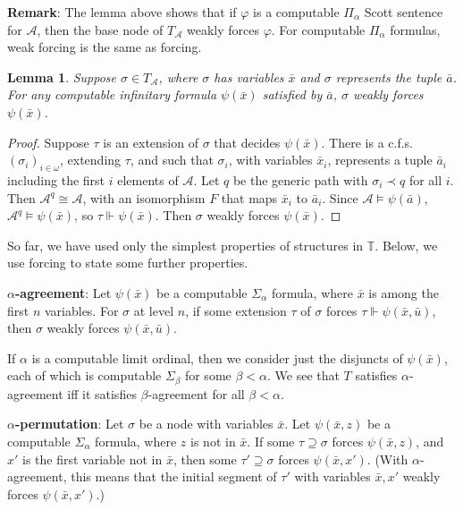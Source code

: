 \documentclass{article}
\newtheorem{lem}[thm]{Lemma}
\begin{document}
\noindent
\textbf{Remark}:  The lemma above shows that if $\varphi$ is a computable $\Pi_\alpha$ Scott sentence for $\mathcal{A}$, then the base node of $T_\mathcal{A}$ weakly forces $\varphi$.  For computable $\Pi_\alpha$ formulas, weak forcing is the same as forcing.     

\bigskip

\begin{lem}

Suppose $\sigma\in T_\mathcal{A}$, where $\sigma$ has variables $\bar{x}$ and $\sigma$ represents the tuple $\bar{a}$.  For any computable infinitary formula $\psi(\bar{x})$ satisfied by $\bar{a}$, $\sigma$ weakly forces $\psi(\bar{x})$.  

\end{lem}
 
\begin{proof}

Suppose $\tau$ is an extension of $\sigma$ that decides $\psi(\bar{x})$.  There is a c.f.s.\ $(\sigma_i)_{i\in\omega}$, extending $\tau$, and such that $\sigma_i$, with variables $\bar{x}_i$, represents a tuple $\bar{a}_i$ including the first $i$ elements of $\mathcal{A}$.  Let $q$ be the generic path with $\sigma_i\prec q$ for all $i$.  Then $\mathcal{A}^q\cong\mathcal{A}$, with an isomorphism $F$ that maps $\bar{x}_i$ to $\bar{a}_i$.  Since $\mathcal{A}\models\psi(\bar{a})$, $\mathcal{A}^q\models\psi(\bar{x})$, so $\tau\Vdash\psi(\bar{x})$.  Then $\sigma$ weakly forces $\psi(\bar{x})$.  
\end{proof}

So far, we have used only the simplest properties of structures in $\mathbb{T}$.  Below, we use forcing to state some further properties.

\bigskip
\noindent
\textbf{$\alpha$-agreement}:  Let $\psi(\bar{x})$ be a computable $\Sigma_\alpha$ formula, where $\bar{x}$ is among the first $n$ variables.  For $\sigma$ at level $n$, if some extension $\tau$ of $\sigma$ forces $\tau\Vdash\psi(\bar{x},\bar{u})$, then $\sigma$ weakly forces $\psi(\bar{x},\bar{u})$.

\bigskip
\noindent
If $\alpha$ is a computable limit ordinal, then we consider just the disjuncts of $\psi(\bar{x})$, each of which is computable $\Sigma_\beta$ for some $\beta < \alpha$.  We see that $T$ satisfies $\alpha$-agreement iff it satisfies $\beta$-agreement for all $\beta < \alpha$. 

\bigskip
\noindent
\textbf{$\alpha$-permutation}:  Let $\sigma$ be a node with variables $\bar{x}$.  Let $\psi(\bar{x},z)$ be a computable $\Sigma_\alpha$ formula, where $z$ is not in $\bar{x}$.  If some $\tau\supseteq\sigma$ forces $\psi(\bar{x},z)$, and $x'$ is the first variable not in $\bar{x}$, then some $\tau'\supseteq\sigma$ forces $\psi(\bar{x},x')$.  (With $\alpha$-agreement, this means that the initial segment of $\tau'$ with variables $\bar{x},x'$ weakly forces $\psi(\bar{x},x')$.) 
\end{document}
